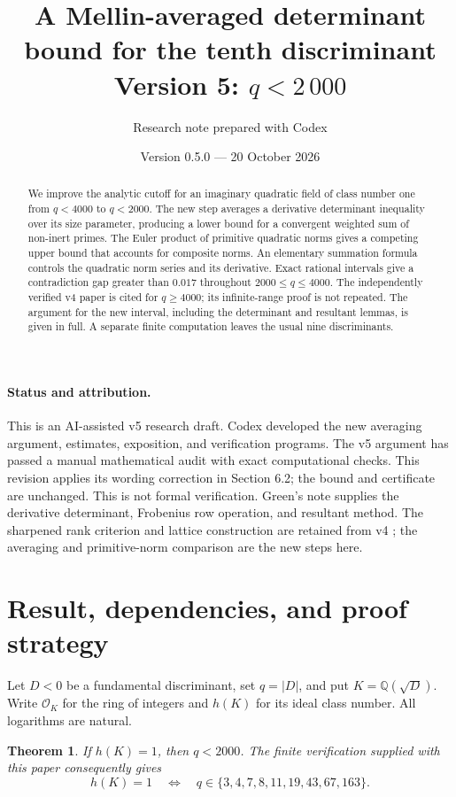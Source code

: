\documentclass[11pt]{article}
\title{A Mellin-averaged determinant bound for the tenth discriminant\\
\large Version 5: \(q<2\,000\)}
\author{Research note prepared with Codex}
\date{Version 0.5.0 --- 20 October 2026}
\newtheorem{theorem}{Theorem}
\newcommand{\Q}{\mathbb Q}
\newcommand{\OK}{\mathcal O_K}
\begin{document}
\maketitle

\begin{abstract}
We improve the analytic cutoff for an imaginary quadratic field of class
number one from \(q<4000\) to \(q<2000\). The new step averages a derivative
determinant inequality over its size parameter, producing a lower bound
for a convergent weighted sum of non-inert primes. The Euler product of
primitive quadratic norms gives a competing upper bound that accounts
for composite norms. An elementary summation formula controls the
quadratic norm series and its derivative. Exact rational intervals give
a contradiction gap greater than \(0.017\) throughout
\(2000\le q\le4000\). The independently verified v4 paper is cited for
\(q\ge4000\); its infinite-range proof is not repeated. The argument for
the new interval, including the determinant and resultant lemmas, is
given in full. A separate finite computation leaves the usual nine
discriminants.
\end{abstract}

\paragraph{Status and attribution.}
This is an AI-assisted v5 research draft. Codex developed the new
averaging argument, estimates, exposition, and verification programs.
The v5 argument has passed a manual mathematical audit with exact
computational checks. This revision applies its wording correction in
Section 6.2; the bound and certificate are unchanged. This is not formal
verification. Green's note \cite{green} supplies the
derivative determinant, Frobenius row operation, and resultant method.
The sharpened rank criterion and lattice construction are retained from
v4 \cite{v4}; the averaging and primitive-norm comparison are the new
steps here.

\section{Result, dependencies, and proof strategy}

Let \(D<0\) be a fundamental discriminant, set \(q=|D|\), and put
\(K=\Q(\sqrt D)\). Write \(\OK\) for the ring of integers and \(h(K)\)
for its ideal class number. All logarithms are natural.

\begin{theorem}\label{main}
If \(h(K)=1\), then \(q<2000\). The finite verification supplied with
this paper consequently gives
\[
 h(K)=1\quad\Longleftrightarrow\quad
 q\in\{3,4,7,8,11,19,43,67,163\}.
\]
\end{theorem}
\end{document}
